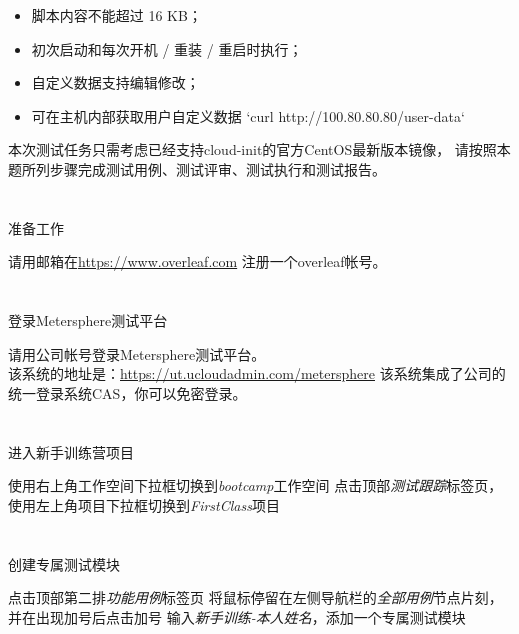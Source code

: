 \documentclass[12pt,addpoints,fleqn]{exam}
\begin{document}
\begin{questions}
\begin{itemize}
  \item 脚本内容不能超过 16 KB；
  \item 初次启动和每次开机 / 重装 / 重启时执行；
  \item 自定义数据支持编辑修改；
  \item 可在主机内部获取用户自定义数据 `curl http://100.80.80.80/user-data`
\end{itemize}
本次测试任务只需考虑已经支持cloud-init的官方CentOS最新版本镜像，
请按照本题所列步骤完成测试用例、测试评审、测试执行和测试报告。

\begin{parts}
  \part{}准备工作

  请用邮箱在\href{https://www.overleaf.com}{https://www.overleaf.com} 注册一个overleaf帐号。
  
  \part{}登录Metersphere测试平台

  请用公司帐号登录Metersphere测试平台。\\
  该系统的地址是：\href{https://ut.ucloudadmin.com/metersphere}{https://ut.ucloudadmin.com/metersphere}
  该系统集成了公司的统一登录系统CAS，你可以免密登录。
  
  \part{}进入新手训练营项目
  \begin{subparts}
    \subpart{}使用右上角工作空间下拉框切换到\emph{bootcamp}工作空间
    \subpart{}点击顶部\emph{测试跟踪}标签页，使用左上角项目下拉框切换到\emph{FirstClass}项目
  \end{subparts}

  \part{}创建专属测试模块
  \begin{subparts}
    \subpart{}点击顶部第二排\emph{功能用例}标签页
    \subpart{}将鼠标停留在左侧导航栏的\emph{全部用例}节点片刻，并在出现加号后点击加号
    \subpart{}输入\emph{新手训练-本人姓名}，添加一个专属测试模块
  \end{subparts}


\end{parts}
\end{questions}
\end{document}

